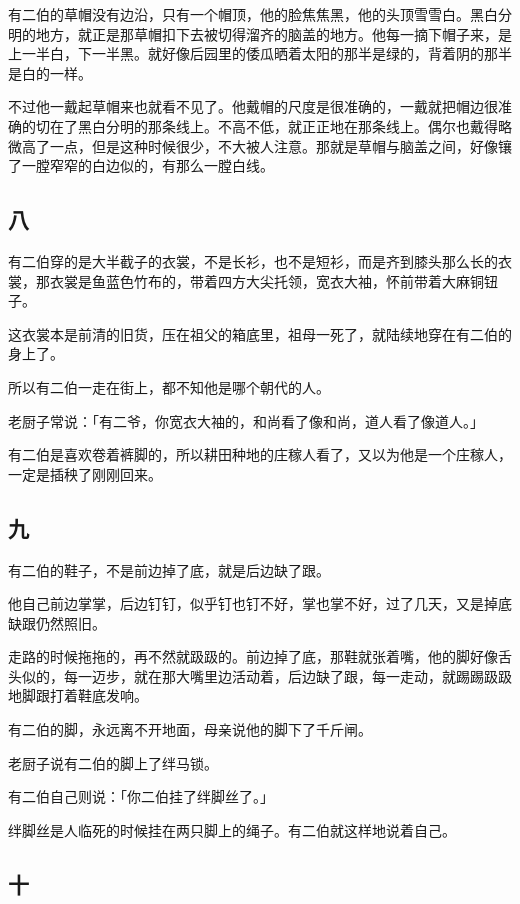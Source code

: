 \documentclass[UTF8]{ctexart}
\begin{document}
有二伯的草帽没有边沿，只有一个帽顶，他的脸焦焦黑，他的头顶雪雪白。黑白分明的地方，就正是那草帽扣下去被切得溜齐的脑盖的地方。他每一摘下帽子来，是上一半白，下一半黑。就好像后园里的倭瓜晒着太阳的那半是绿的，背着阴的那半是白的一样。

不过他一戴起草帽来也就看不见了。他戴帽的尺度是很准确的，一戴就把帽边很准确的切在了黑白分明的那条线上。不高不低，就正正地在那条线上。偶尔也戴得略微高了一点，但是这种时候很少，不大被人注意。那就是草帽与脑盖之间，好像镶了一膛窄窄的白边似的，有那么一膛白线。

\subsection{八}

有二伯穿的是大半截子的衣裳，不是长衫，也不是短衫，而是齐到膝头那么长的衣裳，那衣裳是鱼蓝色竹布的，带着四方大尖托领，宽衣大袖，怀前带着大麻铜钮子。

这衣裳本是前清的旧货，压在祖父的箱底里，祖母一死了，就陆续地穿在有二伯的身上了。

所以有二伯一走在街上，都不知他是哪个朝代的人。

老厨子常说：「有二爷，你宽衣大袖的，和尚看了像和尚，道人看了像道人。」

有二伯是喜欢卷着裤脚的，所以耕田种地的庄稼人看了，又以为他是一个庄稼人，一定是插秧了刚刚回来。

\subsection{九}

有二伯的鞋子，不是前边掉了底，就是后边缺了跟。

他自己前边掌掌，后边钉钉，似乎钉也钉不好，掌也掌不好，过了几天，又是掉底缺跟仍然照旧。

走路的时候拖拖的，再不然就趿趿的。前边掉了底，那鞋就张着嘴，他的脚好像舌头似的，每一迈步，就在那大嘴里边活动着，后边缺了跟，每一走动，就踢踢趿趿地脚跟打着鞋底发响。

有二伯的脚，永远离不开地面，母亲说他的脚下了千斤闸。

老厨子说有二伯的脚上了绊马锁。

有二伯自己则说：「你二伯挂了绊脚丝了。」

绊脚丝是人临死的时候挂在两只脚上的绳子。有二伯就这样地说着自己。

\subsection{十}
\end{document}
